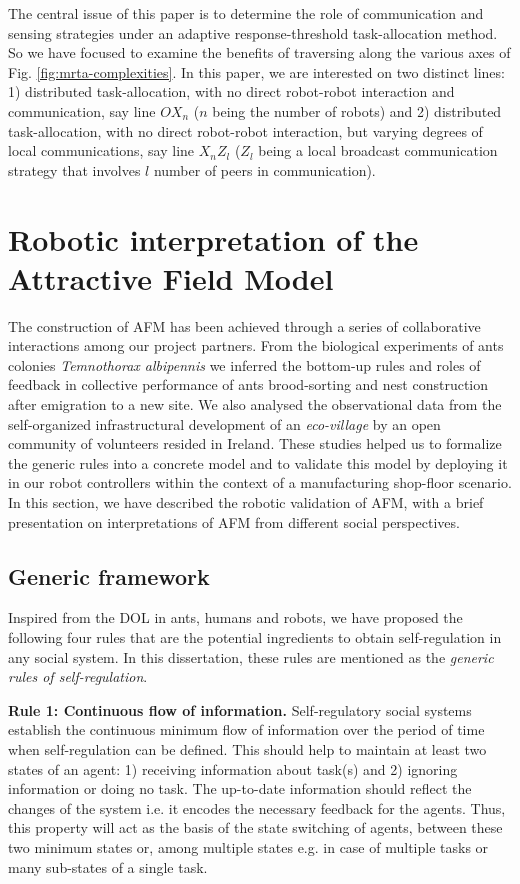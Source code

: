 \documentclass[preprint,12pt]{elsarticle}
\begin{document}
The central issue of this paper is to determine the role of communication and sensing strategies under an adaptive response-threshold task-allocation method. So we have focused to examine the benefits of traversing along the various axes of Fig. \ref{fig:mrta-complexities}. In this paper, we are interested on two distinct lines: 1) distributed task-allocation, with no direct robot-robot interaction and communication, say line $OX_{n}$ ($n$ being the number of robots)  and 2) distributed task-allocation, with no direct robot-robot interaction, but varying degrees of local communications, say line $X_{n}Z_{l}$  ($Z_{l}$ being a local broadcast communication strategy that involves $l$ number of peers in communication).
\section{Robotic interpretation of the Attractive Field Model}
\label{sec:afm}
The construction of AFM has been achieved through a series of collaborative interactions among our project partners. From the biological experiments of ants colonies {\em Temnothorax albipennis} we  inferred the bottom-up rules and roles of feedback in collective performance of ants brood-sorting and nest construction after emigration to a new site. We  also analysed the observational data from the self-organized infrastructural development of an {\em eco-village} by an open community of volunteers resided in Ireland. These studies helped us to formalize the generic rules into a concrete model  and to validate this model by deploying it in our robot controllers within the context of a manufacturing shop-floor scenario. In this section, we have described the robotic validation of AFM, with a brief presentation on interpretations of AFM from different social perspectives.
\subsection{Generic framework}
\label{afm:framework}
Inspired from the DOL in ants, humans and robots,  we  have proposed the following four rules that are the potential ingredients to obtain self-regulation in any social system. In this dissertation, these rules are mentioned as the {\em generic rules of self-regulation}.

\textbf{Rule 1: Continuous flow of information.} Self-regulatory social systems establish the continuous minimum flow of information over the period of time when self-regulation can be defined. This should help to maintain at least two states of an agent: 1) receiving information about task(s) and 2) ignoring information or doing no task. The up-to-date information should reflect  the changes of the system i.e. it encodes the necessary feedback for the agents. Thus, this property will act as the basis of the state switching of agents, between these two minimum states or, among multiple states e.g. in case of multiple tasks or many sub-states of a single task.
\end{document}
